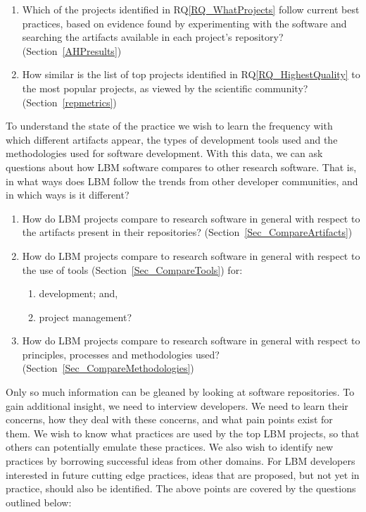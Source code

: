 \documentclass[final, 3p, times, authoryear]{elsarticle}
\newcounter{rqnum} %
\newcommand{\rqref}[1]{RQ\ref{#1}}
\begin{document}
\begin{enumerate}
	\item [RQ\refstepcounter{rqnum}\therqnum \label{RQ_HighestQuality}:] Which
	of the projects identified in \rqref{RQ_WhatProjects} follow current best
	practices, based on evidence found by experimenting with the software and
	searching the artifacts available in each project's repository? (Section~\ref{AHPresults})
	\item [RQ\refstepcounter{rqnum}\therqnum \label{RQ_CompareHQ2Popular}:] How
	similar is the list of top projects identified in \rqref{RQ_HighestQuality}
	to the most popular projects, as viewed by the scientific community? (Section~\ref{repmetrics})
\end{enumerate}

To understand the state of the practice we wish to learn the frequency with
which different artifacts appear, the types of development tools used and the
methodologies used for software development.  With this data, we can ask
questions about how LBM software compares to other research software.  That is,
in what ways does LBM follow the trends from other developer communities, and in
which ways is it different?

\begin{enumerate}
    \item [RQ\refstepcounter{rqnum}\therqnum \label{RQ_CompareArtifacts}:] How
	do LBM projects compare to research software in general with respect to the
	artifacts present in their repositories?
	(Section~\ref{Sec_CompareArtifacts})
	\item [RQ\refstepcounter{rqnum}\therqnum \label{RQ_CompareToolsProjMngmnt}:]
	How do LBM projects compare to research software in general with respect to
	the use of tools (Section~\ref{Sec_CompareTools}) for:
	\begin{enumerate} 
		\item [\rqref{RQ_CompareToolsProjMngmnt}.a] development; and,
		\item [\rqref{RQ_CompareToolsProjMngmnt}.b] project management?
	\end{enumerate}
	\item [RQ\refstepcounter{rqnum}\therqnum \label{RQ_CompareMethodologies}:]
	How do LBM projects compare to research software in general with respect to
	principles, processes and methodologies used? (Section~\ref{Sec_CompareMethodologies})
\end{enumerate}	

Only so much information can be gleaned by looking at software repositories.  To
gain additional insight, we need to interview developers.  We need to learn
their concerns, how they deal with these concerns, and what pain points exist
for them.  We wish to know what practices are used by the top LBM projects, so
that others can potentially emulate these practices. We also wish to identify
new practices by borrowing successful ideas from other domains. For LBM
developers interested in future cutting edge practices, ideas that are proposed,
but not yet in practice, should also be identified.  The above points are
covered by the questions outlined below:
\end{document}
